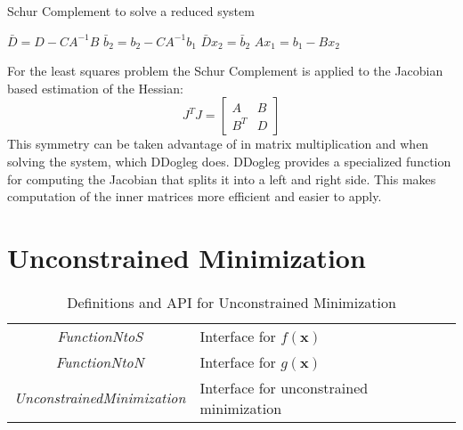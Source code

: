 \documentclass[peerreview,compsoc,onecolumn]{IEEEtran}
\begin{document}
\begin{algorithm}{}
\caption{\label{alg:schur_complement}Schur Complement to solve a reduced system}
\begin{algorithmic}[1]
	\State $\bar{D} = D - C A^{-1} B$
	\State $\bar{b}_2 = b_2 - C A^{-1} b_1$  
	\State $\bar{D} x_2 = \bar{b}_2$         
	\State $A x_1 = b_1 - B x_2$
\end{algorithmic}
\end{algorithm}

For the least squares problem the Schur Complement is applied to the Jacobian based estimation of the Hessian:
\begin{equation}
J^T J =
\begin{bmatrix}
A & B \\
B^T & D
\end{bmatrix}
\end{equation}
This symmetry can be taken advantage of in matrix multiplication and when solving the system, which DDogleg does. DDogleg provides a specialized function for computing the Jacobian that splits it into a left and right side. This makes computation of the inner matrices more efficient and easier to apply.


\section{Unconstrained Minimization}

\begin{table}[h]
\centering
\caption{\label{definitions:UM}Definitions and API for Unconstrained Minimization}
\begin{tabular}{cl}
\textit{FunctionNtoS} & Interface for $f(\bm{x})$ \\
\textit{FunctionNtoN} & Interface for $g(\bm{x})$ \\
\textit{UnconstrainedMinimization} & Interface for unconstrained minimization
\end{tabular}
\end{table}
\end{document}
